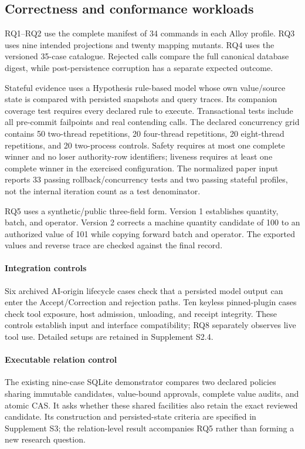 \subsection{Correctness and conformance workloads}

RQ1--RQ2 use the complete manifest of 34 commands in each Alloy profile. RQ3 uses nine intended projections and twenty mapping mutants. RQ4 uses the versioned 35-case catalogue. Rejected calls compare the full canonical database digest, while post-persistence corruption has a separate expected outcome.

Stateful evidence uses a Hypothesis rule-based model whose own value/source state is compared with persisted snapshots and query traces. Its companion coverage test requires every declared rule to execute. Transactional tests include all pre-commit failpoints and real contending calls. The declared concurrency grid contains 50 two-thread repetitions, 20 four-thread repetitions, 20 eight-thread repetitions, and 20 two-process controls. Safety requires at most one complete winner and no loser authority-row identifiers; liveness requires at least one complete winner in the exercised configuration. The normalized paper input reports 33 passing rollback/concurrency tests and two passing stateful profiles, not the internal iteration count as a test denominator.

RQ5 uses a synthetic/public three-field form. Version 1 establishes quantity, batch, and operator. Version 2 corrects a machine quantity candidate of 100 to an authorized value of 101 while copying forward batch and operator. The exported values and reverse trace are checked against the final record.

\paragraph{Integration controls}
Six archived AI-origin lifecycle cases check that a persisted model output can enter the Accept/Correction and rejection paths. Ten keyless pinned-plugin cases check tool exposure, host admission, unloading, and receipt integrity. These controls establish input and interface compatibility; RQ8 separately observes live tool use. Detailed setups are retained in Supplement S2.4.

\paragraph{Executable relation control}
The existing nine-case SQLite demonstrator compares two declared policies sharing immutable candidates, value-bound approvals, complete value audits, and atomic CAS. It asks whether these shared facilities also retain the exact reviewed candidate. Its construction and persisted-state criteria are specified in Supplement S3; the relation-level result accompanies RQ5 rather than forming a new research question.

